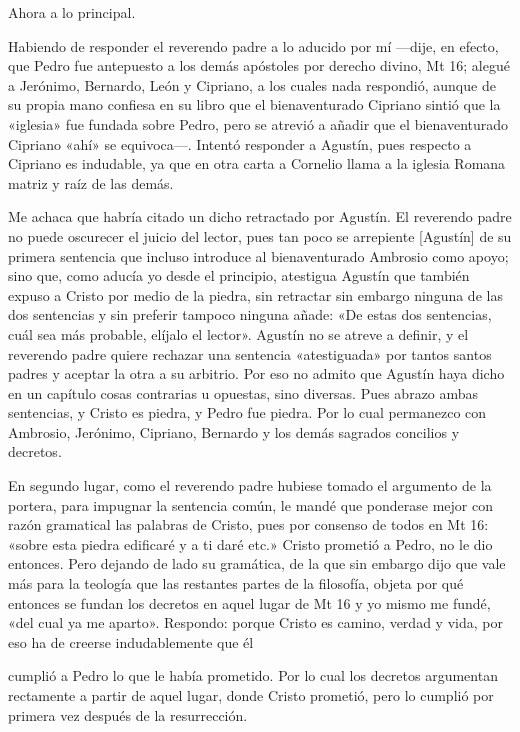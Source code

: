Ahora a lo principal.

Habiendo de responder el reverendo padre a lo aducido por mí —dije, en efecto, que Pedro fue antepuesto a los demás apóstoles por derecho divino, Mt 16; alegué a Jerónimo, Bernardo, León y Cipriano, a los cuales nada respondió, aunque de su propia mano confiesa en su libro que el bienaventurado Cipriano sintió que la «iglesia» fue fundada sobre Pedro, pero se atrevió a añadir que el bienaventurado Cipriano «ahí» se equivoca—. Intentó responder a Agustín, pues respecto a Cipriano es indudable, ya que en otra carta a Cornelio llama a la iglesia Romana matriz y raíz de las demás.

Me achaca que habría citado un dicho retractado por Agustín. El reverendo padre no puede oscurecer el juicio del lector, pues tan poco se arrepiente [Agustín] de su primera sentencia que incluso introduce al bienaventurado Ambrosio como apoyo; sino que, como aducía yo desde el principio, atestigua Agustín que también expuso a Cristo por medio de la piedra, sin retractar sin embargo ninguna de las dos sentencias y sin preferir tampoco ninguna añade: «De estas dos sentencias, cuál sea más probable, elíjalo el lector». Agustín no se atreve a definir, y el reverendo padre quiere rechazar una sentencia «atestiguada» por tantos santos padres y aceptar la otra a su arbitrio. Por eso no admito que Agustín haya dicho en un capítulo cosas contrarias u opuestas, sino diversas. Pues abrazo ambas sentencias, y Cristo es piedra, y \marginpar{\small[293]} Pedro fue piedra. Por lo cual permanezco con Ambrosio, Jerónimo, Cipriano, Bernardo y los demás sagrados concilios y decretos.

En segundo lugar, como el reverendo padre hubiese tomado el argumento de la portera, para impugnar la sentencia común, le mandé que ponderase mejor con razón gramatical las palabras de Cristo, pues por consenso de todos en Mt 16: «sobre esta piedra edificaré y a ti daré etc.» Cristo prometió a Pedro, no le dio entonces. Pero dejando de lado su gramática, de la que sin embargo dijo que vale más para la teología que las restantes partes de la filosofía, objeta por qué entonces se fundan los decretos en aquel lugar de Mt 16 y yo mismo me fundé, «del cual ya me aparto». Respondo: porque Cristo es camino, verdad y vida, por eso ha de creerse indudablemente que él

cumplió a Pedro lo que le había prometido. Por lo cual los decretos argumentan rectamente a partir de aquel lugar, donde Cristo prometió, pero lo cumplió por primera vez después de la resurrección.

